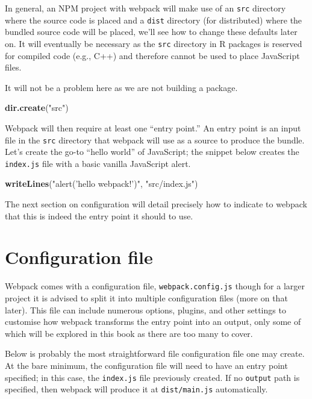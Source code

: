 \documentclass[10pt,]{krantz}
\makeatletter
\newenvironment{Shaded}{\begin{snugshade}}{\end{snugshade}}
\newcommand{\KeywordTok}[1]{\textcolor[rgb]{0.27,0.27,0.27}{\textbf{#1}}}
\newcommand{\NormalTok}[1]{#1}
\newcommand{\StringTok}[1]{\textcolor[rgb]{0.5,0.5,0.5}{#1}}
\newenvironment{kframe}{%
\medskip{}
\setlength{\fboxsep}{.8em}
 \def\at@end@of@kframe{}%
 \ifinner\ifhmode%
  \def\at@end@of@kframe{\end{minipage}}%
  \begin{minipage}{\columnwidth}%
 \fi\fi%
 \def\FrameCommand##1{\hskip\@totalleftmargin \hskip-\fboxsep
 \colorbox{shadecolor}{##1}\hskip-\fboxsep
     \hskip-\linewidth \hskip-\@totalleftmargin \hskip\columnwidth}%
 \MakeFramed {\advance\hsize-\width
   \@totalleftmargin\z@ \linewidth\hsize
   \@setminipage}}%
 {\par\unskip\endMakeFramed%
 \at@end@of@kframe}
\renewenvironment{Shaded}{\begin{kframe}}{\end{kframe}}
\makeatother
\begin{document}
In general, an NPM project with webpack will make use of an \texttt{src} directory where the source code is placed and a \texttt{dist} directory (for distributed) where the bundled source code will be placed, we'll see how to change these defaults later on. It will eventually be necessary as the \texttt{src} directory in R packages is reserved for compiled code (e.g., C++) and therefore cannot be used to place JavaScript files.

It will not be a problem here as we are not building a package.

\begin{Shaded}
\begin{Highlighting}[]
\KeywordTok{dir.create}\NormalTok{(}\StringTok{"src"}\NormalTok{)}
\end{Highlighting}
\end{Shaded}

Webpack will then require at least one ``entry point.'' An entry point is an input file in the \texttt{src} directory that webpack will use as a source to produce the bundle. Let's create the go-to ``hello world'' of JavaScript; the snippet below creates the \texttt{index.js} file with a basic vanilla JavaScript alert.

\begin{Shaded}
\begin{Highlighting}[]
\KeywordTok{writeLines}\NormalTok{(}\StringTok{"alert('hello webpack!')"}\NormalTok{, }\StringTok{"src/index.js"}\NormalTok{) }
\end{Highlighting}
\end{Shaded}

The next section on configuration will detail precisely how to indicate to webpack that this is indeed the entry point it should to use.

\hypertarget{webpack-intro-conf}{%
\section{Configuration file}\label{webpack-intro-conf}}

Webpack comes with a configuration file, \texttt{webpack.config.js} though for a larger project it is advised to split it into multiple configuration files (more on that later). This file can include numerous options, plugins, and other settings to customise how webpack transforms the entry point into an output, only some of which will be explored in this book as there are too many to cover.

Below is probably the most straightforward file configuration file one may create. At the bare minimum, the configuration file will need to have an entry point specified; in this case, the \texttt{index.js} file previously created. If no \texttt{output} path is specified, then webpack will produce it at \texttt{dist/main.js} automatically.
\end{document}
